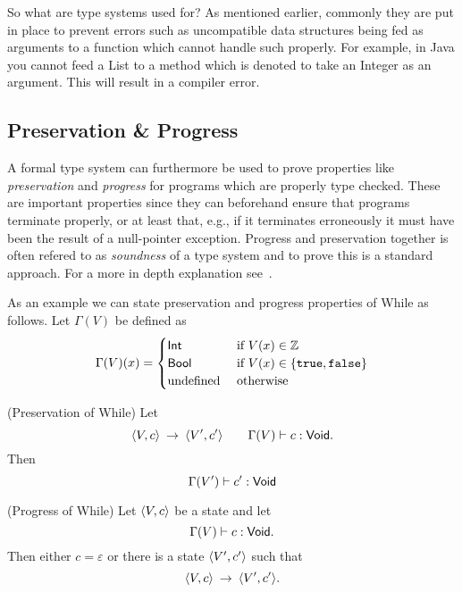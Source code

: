 So what are type systems used for? As mentioned earlier, commonly they are put
in place to prevent errors such as uncompatible data structures being fed as arguments
to a function which cannot handle such properly. For example, in Java you cannot feed a
List to a method which is denoted to take an Integer as an argument. This will
result in a compiler error.

\subsection{Preservation \& Progress}
\label{sub:preservation_&_progress}

A formal type system can furthermore be used to prove properties like
\emph{preservation} and \emph{progress} for programs which are properly type
checked. These are important properties since they can beforehand ensure that
programs terminate properly, or at least that, e.g., if it terminates erroneously it
must have been the result of a null-pointer exception. Progress and preservation
together is often refered to as \emph{soundness} of a type system and to prove this
is a standard approach. For a more in depth explanation
see~\parencite{pierce2002types}.

As an example we can state preservation and progress properties of While as follows. Let
$\Gamma(V)$ be defined as 
\[
  \Gamma(V)(x) = \begin{cases}
    \mbox{$\mathsf{Int}$} & \text{ if } V(x) \in \mathbb{Z} \\
    \mbox{$\mathsf{Bool}$} & \text{ if } V(x) \in \left\{\mbox{\texttt{true}}, \mbox{\texttt{false}} \right\} \\
    \text{undefined} & \text{ otherwise }
  \end{cases}
\]
\begin{proposition}{(Preservation of While)} 
  Let
  \begin{equation*}
    \langle V, c \rangle \: \rightarrow \: \langle V', c' \rangle \quad\quad \Gamma(V) \vdash
    c: \mbox{$\mathsf{Void}$}.
  \end{equation*}
  Then 
  \begin{equation}
    \Gamma(V') \vdash c': \mbox{$\mathsf{Void}$}
  \end{equation}
\end{proposition}
\begin{proposition}{(Progress of While)}
  Let $\langle V, c \rangle$ be a state and let
  \begin{equation*}
    \Gamma(V) \vdash c: \mbox{$\mathsf{Void}$}.
  \end{equation*}
  Then either $c = \varepsilon$ or there is a state $\langle V', c' \rangle$ such that
  \begin{equation*}
    \langle V, c \rangle \: \rightarrow \: \langle V', c' \rangle.
  \end{equation*}
\end{proposition}


